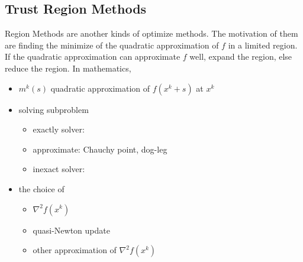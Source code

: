 \subsection{Trust Region Methods}
	Region Methods are another kinds of optimize methods. The motivation of them are finding the minimize of the quadratic approximation of $f$ in a limited region. If the quadratic approximation can approximate $f$ well, expand the region, else reduce the region. In mathematics,
	\vspace{-5mm}
	\begin{itemize}
		\item $m^k(s)$ quadratic approximation of $f(x^k+s)$ at $x^k$
		\vspace{-5mm}
		\item solving subproblem
		\begin{itemize}
			\item exactly solver: 
			\item approximate: Chauchy point, dog-leg
			\item inexact solver: 
		\end{itemize}
		\item the choice of 
		\begin{itemize}
			\item $\nabla^2 f(x^k)$\\[1mm]
			\item quasi-Newton update\\[1mm]
			\item other approximation of $\nabla^2 f(x^k)$
		\end{itemize}
	\end{itemize}


